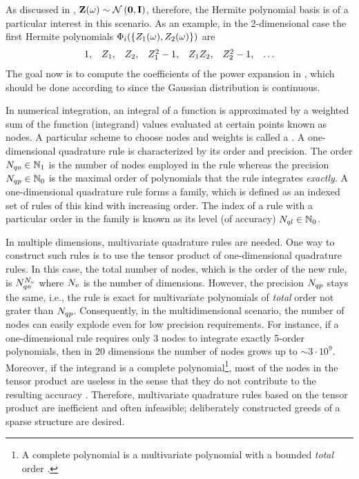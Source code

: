 As discussed in , $\vZ(\o) \sim \normal{\vZero}{\mI}$, therefore, the Hermite polynomial basis is of a particular interest in this scenario. As an example, in the 2-dimensional case the first Hermite polynomials $\Phi_i(\{ Z_1(\omega), Z_2(\omega) \})$ are
\[
  \begin{array}{lllllll}
  1, & Z_1, & Z_2, & Z_1^2 - 1, & Z_1 Z_2, & Z_2^2 - 1, & \dotsc
  \end{array}
\]
The goal now is to compute the coefficients of the power expansion in , which should be done according to  since the Gaussian distribution is continuous.

In numerical integration, an integral of a function is approximated by a weighted sum of the function (integrand) values evaluated at certain points known as nodes. A particular scheme to choose nodes and weights is called a . A one-dimensional quadrature rule is characterized by its order and precision. The order $N_{qo} \in \mathbb{N}_{1}$ is the number of nodes employed in the rule whereas the precision $N_{qp} \in \mathbb{N}_{0}$ is the maximal order of polynomials that the rule integrates \emph{exactly}. A one-dimensional quadrature rule forms a family, which is defined as an indexed set of rules of this kind with increasing order. The index of a rule with a particular order in the family is known as its level (of accuracy) $N_{ql} \in \mathbb{N}_{0}$.

In multiple dimensions, multivariate quadrature rules are needed. One way to construct such rules is to use the tensor product of one-dimensional quadrature rules. In this case, the total number of nodes, which is the order of the new rule, is $N_{qo}^{N_v}$ where ${N_v}$ is the number of dimensions. However, the precision $N_{qp}$ stays the same, i.e., the rule is exact for multivariate polynomials of \emph{total} order not grater than $N_{qp}$. Consequently, in the multidimensional scenario, the number of nodes can easily explode even for low precision requirements. For instance, if a one-dimensional rule requires only 3 nodes to integrate exactly 5-order polynomials, then in 20 dimensions the number of nodes grows up to $\sim 3 \cdot 10^9$. Moreover, if the integrand is a complete polynomial\footnote{A complete polynomial is a multivariate polynomial with a bounded \emph{total} order \cite{heiss2008}.}, most of the nodes in the tensor product are useless in the sense that they do not contribute to the resulting accuracy \cite{heiss2008}. Therefore, multivariate quadrature rules based on the tensor product are inefficient and often infeasible; deliberately constructed greeds of a sparse structure are desired.

